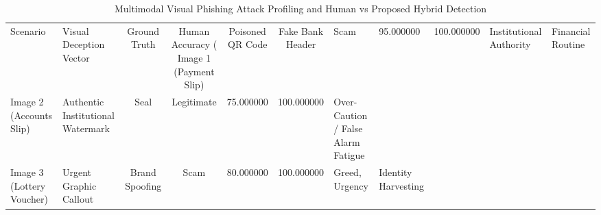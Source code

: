 \begin{table}
\caption{Multimodal Visual Phishing Attack Profiling and Human vs Proposed Hybrid Detection}
\label{tab:multimodal_visual_profiling}
\begin{tabular}{llcccc}
\toprule
Scenario & Visual Deception Vector & Ground Truth & Human Accuracy (%
\midrule
Image 1 (Payment Slip) & Poisoned QR Code & Fake Bank Header & Scam & 95.000000 & 100.000000 & Institutional Authority & Financial Routine \\
Image 2 (Accounts Slip) & Authentic Institutional Watermark & Seal & Legitimate & 75.000000 & 100.000000 & Over-Caution / False Alarm Fatigue \\
Image 3 (Lottery Voucher) & Urgent Graphic Callout & Brand Spoofing & Scam & 80.000000 & 100.000000 & Greed, Urgency & Identity Harvesting \\
\bottomrule
\end{tabular}
\end{table}
